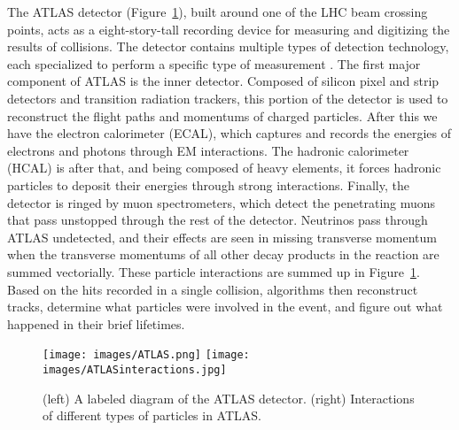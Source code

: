 The ATLAS detector (Figure~\ref{ATLAS}), built around one of the LHC beam crossing points, acts as a eight-story-tall recording device for measuring and digitizing the results of collisions. The detector contains multiple types of detection technology, each specialized to perform a specific type of measurement \cite{ATLAS_website}. The first major component of ATLAS is the inner detector. Composed of silicon pixel and strip detectors and transition radiation trackers, this portion of the detector is used to reconstruct the flight paths and momentums of charged particles. After this we have the electron calorimeter (ECAL), which captures and records the energies of electrons and photons through EM interactions. The hadronic calorimeter (HCAL) is after that, and being composed of heavy elements, it forces hadronic particles to deposit their energies through strong interactions. Finally, the detector is ringed by muon spectrometers, which detect the penetrating muons that pass unstopped through the rest of the detector. Neutrinos pass through ATLAS undetected, and their effects are seen in missing transverse momentum when the transverse momentums of all other decay products in the reaction are summed vectorially. These particle interactions are summed up in Figure~\ref{ATLAS}. Based on the hits recorded in a single collision, algorithms then reconstruct tracks, determine what particles were involved in the event, and figure out what happened in their brief lifetimes.

\begin{figure}[t]
    \centering
    \texttt{[image: images/ATLAS.png]}
    \texttt{[image: images/ATLASinteractions.jpg]}
    \caption{(left) A labeled diagram of the ATLAS detector. (right) Interactions of different types of particles in ATLAS.}
    \label{ATLAS}
\end{figure}


